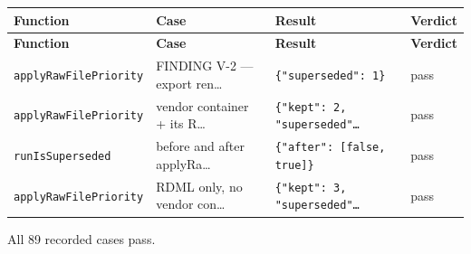 {\small
\begin{xltabular}{\linewidth}{|X|X|X|X|}
\toprule \textbf{Function} & \textbf{Case} & \textbf{Result} & \textbf{Verdict} \\\midrule\endfirsthead
\toprule \textbf{Function} & \textbf{Case} & \textbf{Result} & \textbf{Verdict} \\\midrule\endhead
\texttt{applyRawFilePriority} & FINDING V-2 — export ren… & \texttt{\{"superseded": 1\}} & pass \\
\texttt{applyRawFilePriority} & vendor container + its R… & \texttt{\{"kept": 2, "superseded"…} & pass \\
\texttt{runIsSuperseded} & before and after applyRa… & \texttt{\{"after": [false, true]\}} & pass \\
\texttt{applyRawFilePriority} & RDML only, no vendor con… & \texttt{\{"kept": 3, "superseded"…} & pass \\
\bottomrule
\end{xltabular}}

\par All 89 recorded cases pass.

